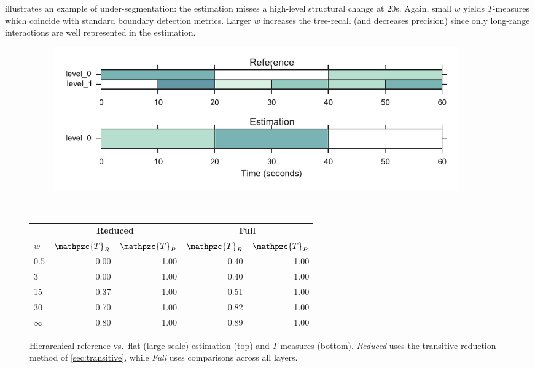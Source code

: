 \documentclass{article}
\def\shag{\ensuremath{\mathpzc{T}}}
\begin{document}
 illustrates an example of under-segmentation: the estimation misses a high-level structural change at 20s.  
Again, small $w$ yields $T$-measures which coincide with standard boundary detection metrics.
Larger $w$ increases the tree-recall (and decreases precision)
since only long-range interactions are well represented in the estimation.


\begin{figure}
  \centering
  \begin{subfigure}{\columnwidth}
    \centering
    \includegraphics[width=0.94\textwidth]{figs/hier-flatlarge.pdf}
  \end{subfigure}%
  \\
  \vspace{-\baselineskip}
  \begin{minipage}{\columnwidth}
    \small
    \centering
    \vspace{10pt}
    \begin{tabular}{lrrrr}
      \toprule
      & \multicolumn{2}{c}{\textbf{Reduced}} & \multicolumn{2}{c}{\textbf{Full}} \\
      $w$       & $\shag_R$    & $\shag_P$  & $\shag_R$ & $\shag_P$    \\
      \midrule
      0.5       & 0.00     & 1.00      & 0.40 & 1.00\\     
      3         & 0.00     & 1.00      & 0.40 & 1.00 \\
      15        & 0.37     & 1.00     & 0.51 & 1.00 \\
      30        & 0.70     & 1.00     & 0.82 & 1.00 \\
      $\infty$  & 0.80     & 1.00            & 0.89 & 1.00\\
      \bottomrule
    \end{tabular}
  \end{minipage}
  \caption{Hierarchical reference vs.\ flat (large-scale) estimation (top) and $T$-measures (bottom).  \emph{Reduced} uses the transitive reduction method of \cref{sec:transitive}, while \emph{Full} uses comparisons across all layers.}\label{fig:hier-flatlarge}
\end{figure}
\end{document}
